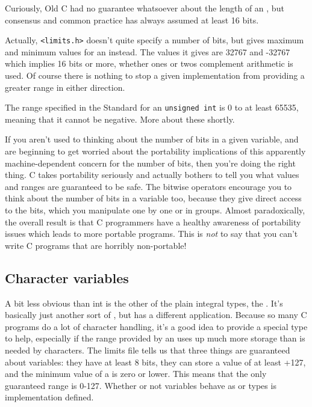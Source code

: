    Curiously, Old C had no guarantee whatsoever about the length of an
    \kint, but consensus and common practice has always assumed at
    least 16 bits.


   Actually, \texttt{<limits.h>} doesn't quite specify a number
    of bits, but gives maximum and minimum values for an \kint{}
    instead. The values it gives are 32767 and -32767 which implies
    16 bits or more, whether ones or twos complement arithmetic is used.
    Of course there is nothing to stop a given implementation from providing a
    greater range in either direction.


   The range specified in the Standard for an \texttt{unsigned int} is
    0 to at least 65535, meaning that it cannot be negative. More about
    these shortly.


   If you aren't used to thinking about the number of bits in a given
    variable, and are beginning to get worried about the portability
    implications of this apparently machine-dependent concern for the number
    of bits, then you're doing the right thing. C takes portability
    seriously and actually bothers to tell you what values and ranges are
    guaranteed to be safe. The bitwise operators encourage you to think about
    the number of bits in a variable too, because they give direct access to
    the bits, which you manipulate one by one or in groups. Almost
    paradoxically, the overall result is that C programmers have a
    healthy awareness of portability issues which leads to more portable
    programs. This is \textit{not} to say that you can't write C programs
    that are horribly non-portable!


  

  \subsection{Character variables}
   

   A bit less obvious than int is the other of the plain integral types,
    the \kchar. It's basically just another sort of
    \kint, but has a different application. Because so many
    C programs do a lot of character handling, it's a good idea to
    provide a special type to help, especially if the range provided by an
    \kint{} uses up much more storage than is needed by characters.
    The limits file tells us that three things are guaranteed about
    \kchar{} variables: they have at least 8 bits, they can store a
    value of at least +127, and the minimum value of a \kchar{}
    is zero or lower. This means that the only guaranteed range
    is 0-127. Whether or not \kchar{} variables behave as
    \signed{} or \unsigned{} types is implementation
    defined.


